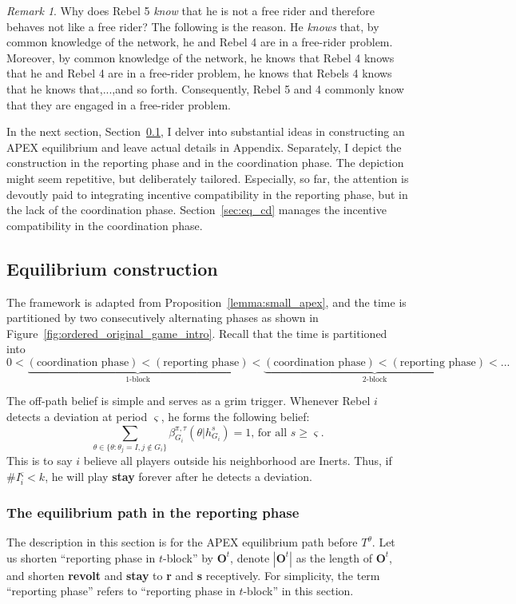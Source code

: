 \documentclass[12pt,letter]{article}
\newcommand{\Omicron}{\mathbf{O}}
\theoremstyle{definition}
\theoremstyle{remark}
\newtheorem*{remark}{Remark}
\theoremstyle{claim}
\begin{document}
\begin{remark}
Why does Rebel 5 \textit{know} that he is not a free rider and therefore behaves not like a free rider? The following is the reason. He \textit{knows} that, by common knowledge of the network, he and Rebel 4 are in a free-rider problem. Moreover, by common knowledge of the network, he knows that Rebel 4 knows that he and Rebel 4 are in a free-rider problem, he knows that Rebels 4 knows that he knows that,...,and so forth. Consequently, Rebel 5 and 4 commonly know that they are engaged in a free-rider problem. 
\end{remark}
In the next section, Section~\ref{sec:dis_writing}, I delver into substantial ideas in constructing an APEX equilibrium and leave actual details in Appendix. Separately, I depict the construction in the reporting phase and in the coordination phase. The depiction might seem repetitive, but deliberately tailored. Especially, so far, the attention is devoutly paid to integrating incentive compatibility in the reporting phase, but in the lack of the coordination phase. Section~\ref{sec:eq_cd} manages the incentive compatibility in the coordination phase.
\subsection{Equilibrium construction}
\label{sec:dis_writing}
The framework is adapted from Proposition~\ref{lemma:small_apex}, and the time is partitioned by two consecutively alternating phases as shown in Figure~\ref{fig:ordered_original_game_intro}. Recall that the time is partitioned into
\[0<\underbrace{(\text{coordination phase})<(\text{reporting phase})}_{\text{$1$-block}}<\underbrace{(\text{coordination phase})<(\text{reporting phase})}_{\text{$2$-block}}<...\]

The off-path belief is simple and serves as a grim trigger. Whenever Rebel $i$ detects a deviation at period $\varsigma$, he forms the following belief: 
\begin{equation}
\label{eq_grim_trigger}
\sum_{\theta \in \{\theta:\theta_j=I,j\notin G_i\}}\beta^{\pi,\tau}_{G_i}({\theta}|h^{s}_{G_i})=1 \text{, for all $s\geq \varsigma$}.
\end{equation}
This is to say $i$ believe all players outside his neighborhood are Inerts. Thus, if $\# I^{\varsigma}_i<k$, he will play \textbf{stay} forever after he detects a deviation. 

\subsubsection{The equilibrium path in the reporting phase}
\label{sec:eq_rp}
The description in this section is for the APEX equilibrium path {before} $T^{\theta}$. Let us shorten ``reporting phase in $t$-block'' by $\Omicron^{t}$, denote $|\Omicron^t|$ as the length of $\Omicron^{t}$, and shorten \textbf{revolt} and \textbf{stay} to \textbf{r} and \textbf{s} receptively. For simplicity, the term ``reporting phase'' refers to ``reporting phase in $t$-block'' in this section.
\end{document}
